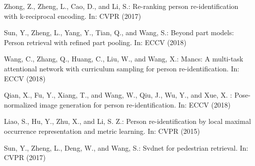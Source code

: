 \documentclass[10pt,twocolumn,letterpaper]{article}
\begin{document}
\begin{thebibliography}{8}
  
\newblock Zhong, Z., Zheng, L., Cao, D., and Li, S.:
\newblock Re-ranking person re-identification with k-reciprocal encoding.
\newblock In: CVPR (2017)

\newblock Sun, Y., Zheng, L., Yang, Y., Tian, Q., and Wang, S.:
\newblock Beyond part models: Person retrieval with refined part pooling.
\newblock In: ECCV (2018)


\newblock Wang, C., Zhang, Q., Huang, C., Liu, W., and Wang, X.:
\newblock Mancs: A multi-task attentional network with curriculum sampling for person re-identification.
\newblock In: ECCV (2018)


\newblock Qian, X., Fu, Y., Xiang, T., and Wang, W., Qiu, J., Wu, Y., and Xue, X. :
\newblock Pose-normalized image generation for person re-identification.
\newblock In: ECCV (2018)


\newblock Liao, S., Hu, Y., Zhu, X., and Li, S. Z.:
\newblock Person re-identification by local maximal occurrence representation and metric learning.
\newblock In: CVPR (2015)

\newblock Sun, Y., Zheng, L., Deng, W., and Wang, S.:
\newblock Svdnet for pedestrian retrieval.
\newblock In: CVPR (2017)




\end{thebibliography}
\end{document}
